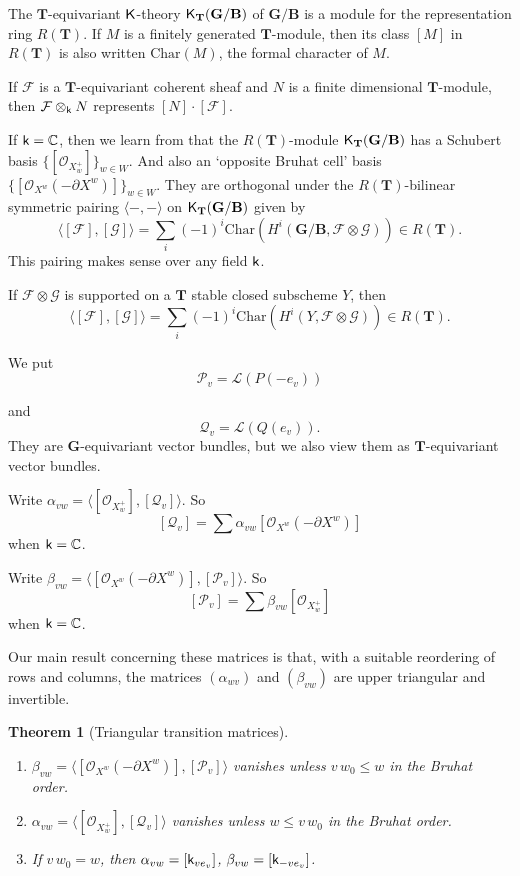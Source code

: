 \documentclass[sn-mathphys-num]{sn-jnl}%
\newcommand\tP{{\mathcal P}}
\newcommand\tQ{{\mathcal Q}}
\newcommand\F{{\mathcal F}}
\newcommand\G{{\mathcal G}}
\newcommand{\Oo}{\mathcal O}
\newcommand{\Ll}{\mathcal L}
\newcommand{\Char}{{\mathrm{Char}}}
\newcommand{\sk}{{\sf k}}
\newcommand{\sK}{{\sf K}}
\newcommand{\cC}{{\mathbb C}}
\newcommand{\bg}{\mathbf G}
\newcommand{\fb}{\mathbf B}
\newcommand{\bt}{\mathbf T}
\newcommand{\fX}{{ X}}
\newtheorem{theorem}{Theorem}[section]
\theoremstyle{definition}
\begin{document}
The $ \bt$-equivariant $\sK$-theory $\sK_{\bt}( \bg/\fb)$ of $ \bg / \fb$ is a module for the representation ring $R( \bt)$.
If $M$ is a finitely generated $\bt$-module, then its class $[M]$ in $R( \bt)$
is also written $\Char(M)$, the formal
character of $M$.

If $\F$ is a $ \bt$-equivariant coherent  sheaf and $N$ is a finite dimensional $ \bt$-module, then $\F\otimes_\sk N $
represents $[N]\cdot[\F]$.

If $\sk=\cC$, then we learn from \cite{GrahamKumar} that the $R( \bt)$-module $\sK_{\bt}( \bg/\fb)$ has a Schubert basis $\{[\Oo_{\fX^+_w}]\}_{w\in W}$.
And also an `opposite Bruhat cell' basis $\{[\Oo_{\fX^w}(-\partial \fX^w)]\}_{w\in W}$.  
They are orthogonal  under the $R( \bt)$-bilinear symmetric
pairing $\langle -, -\rangle$ on $\sK_{\bt}( \bg/\fb)$ given by 
$$\langle [\F],[\G] \rangle=\sum_i(-1)^i\Char(H^i( \bg / \fb,\F\otimes \G ))\in R( \bt).$$
This pairing makes sense over any field $\sk$.

If $\F\otimes\G$ is supported on a $ \bt$ stable closed subscheme $Y$, then 
$$\langle [\F],[\G] \rangle=\sum_i(-1)^i\Char(H^i(Y,\F\otimes\G))\in R( \bt).$$

We put $$\tP_v=\Ll(P(-e_v))$$

and $$\tQ_v=\Ll(Q(e_v)).$$
They are $ \bg $-equivariant vector bundles, but we also view them as $ \bt$-equivariant vector bundles.

Write $\alpha_{vw}=\langle [\Oo_{\fX^+_w}],[\tQ_v] \rangle$. So
$$[\tQ_v]=\sum \alpha_{vw}[\Oo_{\fX^w}(-\partial \fX^w)]$$
when $\sk=\cC$.

Write $\beta_{vw}=\langle [\Oo_{\fX^w}(-\partial \fX^w)],[\tP_v] \rangle$.
So
$$[\tP_v]=\sum \beta_{vw}[\Oo_{\fX^+_w}]$$
when $\sk=\cC$.

Our main result concerning these matrices is
that, with a suitable reordering of rows and columns, the matrices 
$(\alpha_{wv})$ and $(\beta_{vw})$ are upper triangular and invertible. 

\begin{theorem}[Triangular transition matrices]\label{th:triang}
\
\begin{enumerate}
    \item $\beta_{vw}=\langle [\Oo_{\fX^w}(-\partial \fX^w)],[\tP_v] \rangle$ vanishes unless $v\,w_0  \leq w$
    in the Bruhat order.
    \item $\alpha_{vw}=\langle [\Oo_{\fX^+_w}],[\tQ_v] \rangle$ vanishes unless 
    $w\leq v\,w_0$ in the Bruhat order.
    \item If $v\,w_0  = w$,  then $\alpha_{vw}=[\sk_{ve_v}]$, $\beta_{vw}=[\sk_{-ve_v}]$.
\end{enumerate}
\end{theorem}
\end{document}

